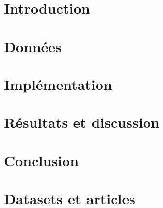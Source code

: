 \documentclass[french, 12pt, letterpaper]{article}
\begin{document}


\newpage
\tableofcontents
\newpage
\listoffigures
\newpage

\section{Introduction}


\section{Données}


\section{Implémentation}


\section{Résultats et discussion}


\section{Conclusion}


\section{Datasets et articles}

\end{document}
